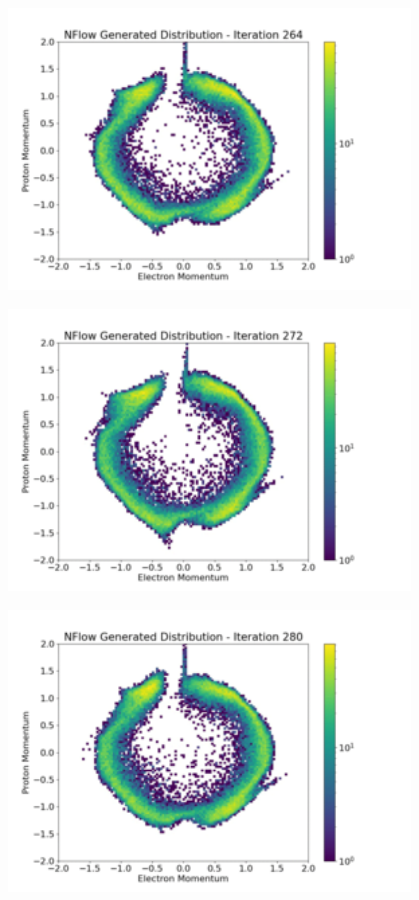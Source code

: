 \documentclass[aspectratio=169]{beamer}
\begin{document}
\begin{frame}[noframenumbering]\centering\includegraphics[width=0.8\textwidth]{images/400training/400training-33.png}\end{frame}
\begin{frame}[noframenumbering]\centering\includegraphics[width=0.8\textwidth]{images/400training/400training-34.png}\end{frame}
\begin{frame}[noframenumbering]\centering\includegraphics[width=0.8\textwidth]{images/400training/400training-35.png}\end{frame}
\end{document}
